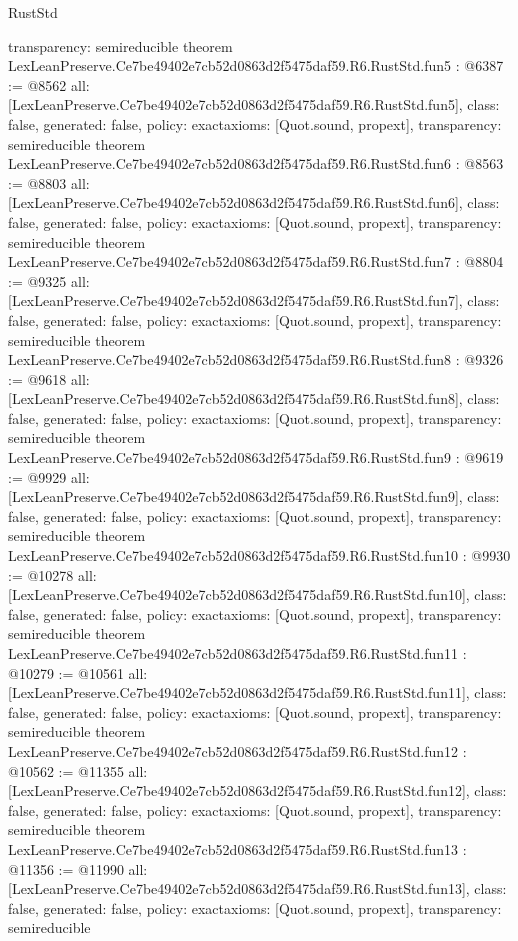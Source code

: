 \begin{lexlean}{RustStd}
\begin{coremodule}
{  transparency: semireducible
}
theorem LexLeanPreserve.Ce7be49402e7cb52d0863d2f5475daf59.R6.RustStd.fun5 : @6387 := @8562 {
  all: [LexLeanPreserve.Ce7be49402e7cb52d0863d2f5475daf59.R6.RustStd.fun5],
  class: false,
  generated: false,
  policy: exact{axioms: [Quot.sound, propext]},
  transparency: semireducible
}
theorem LexLeanPreserve.Ce7be49402e7cb52d0863d2f5475daf59.R6.RustStd.fun6 : @8563 := @8803 {
  all: [LexLeanPreserve.Ce7be49402e7cb52d0863d2f5475daf59.R6.RustStd.fun6],
  class: false,
  generated: false,
  policy: exact{axioms: [Quot.sound, propext]},
  transparency: semireducible
}
theorem LexLeanPreserve.Ce7be49402e7cb52d0863d2f5475daf59.R6.RustStd.fun7 : @8804 := @9325 {
  all: [LexLeanPreserve.Ce7be49402e7cb52d0863d2f5475daf59.R6.RustStd.fun7],
  class: false,
  generated: false,
  policy: exact{axioms: [Quot.sound, propext]},
  transparency: semireducible
}
theorem LexLeanPreserve.Ce7be49402e7cb52d0863d2f5475daf59.R6.RustStd.fun8 : @9326 := @9618 {
  all: [LexLeanPreserve.Ce7be49402e7cb52d0863d2f5475daf59.R6.RustStd.fun8],
  class: false,
  generated: false,
  policy: exact{axioms: [Quot.sound, propext]},
  transparency: semireducible
}
theorem LexLeanPreserve.Ce7be49402e7cb52d0863d2f5475daf59.R6.RustStd.fun9 : @9619 := @9929 {
  all: [LexLeanPreserve.Ce7be49402e7cb52d0863d2f5475daf59.R6.RustStd.fun9],
  class: false,
  generated: false,
  policy: exact{axioms: [Quot.sound, propext]},
  transparency: semireducible
}
theorem LexLeanPreserve.Ce7be49402e7cb52d0863d2f5475daf59.R6.RustStd.fun10 : @9930 := @10278 {
  all: [LexLeanPreserve.Ce7be49402e7cb52d0863d2f5475daf59.R6.RustStd.fun10],
  class: false,
  generated: false,
  policy: exact{axioms: [Quot.sound, propext]},
  transparency: semireducible
}
theorem LexLeanPreserve.Ce7be49402e7cb52d0863d2f5475daf59.R6.RustStd.fun11 : @10279 := @10561 {
  all: [LexLeanPreserve.Ce7be49402e7cb52d0863d2f5475daf59.R6.RustStd.fun11],
  class: false,
  generated: false,
  policy: exact{axioms: [Quot.sound, propext]},
  transparency: semireducible
}
theorem LexLeanPreserve.Ce7be49402e7cb52d0863d2f5475daf59.R6.RustStd.fun12 : @10562 := @11355 {
  all: [LexLeanPreserve.Ce7be49402e7cb52d0863d2f5475daf59.R6.RustStd.fun12],
  class: false,
  generated: false,
  policy: exact{axioms: [Quot.sound, propext]},
  transparency: semireducible
}
theorem LexLeanPreserve.Ce7be49402e7cb52d0863d2f5475daf59.R6.RustStd.fun13 : @11356 := @11990 {
  all: [LexLeanPreserve.Ce7be49402e7cb52d0863d2f5475daf59.R6.RustStd.fun13],
  class: false,
  generated: false,
  policy: exact{axioms: [Quot.sound, propext]},
  transparency: semireducible
}
\end{coremodule}
\end{lexlean}
